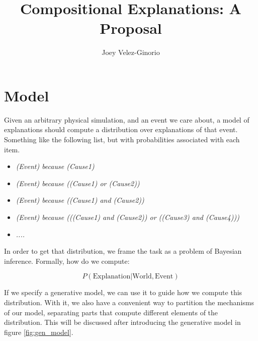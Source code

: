 \documentclass[11pt,a4paper]{article}
\begin{document}
\title{Compositional Explanations: A Proposal}
\author{Joey Velez-Ginorio}
\maketitle




\section{Model}

Given an arbitrary physical simulation, and an event we care about, a model of explanations should compute a distribution over explanations of that event. Something like the following list, but with probabilities associated with each item.

\begin{itemize}
	\item \textit{(Event) because (Cause1)}
	\item \textit{(Event) because ((Cause1) or (Cause2))}
	\item \textit{(Event) because ((Cause1) and (Cause2))}
	\item \textit{(Event) because (((Cause1) and (Cause2)) or ((Cause3) and (Cause4)))}
	\item \textit{....}
\end{itemize}


In order to get that distribution, we frame the task as a problem of Bayesian inference. Formally, how do we compute:

\begin{equation}
P(\text{Explanation}|\text{World}, \text{Event})  
\end{equation}

If we specify a generative model, we can use it to guide how we compute this distribution. With it, we also have a convenient way to partition the mechanisms of our model, separating parts that compute different elements of the distribution. This will be discussed after introducing the generative model in figure \ref{fig:gen_model}.
\end{document}
